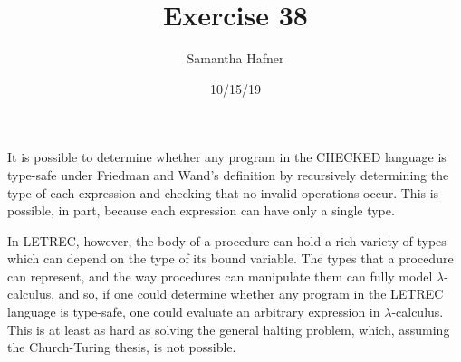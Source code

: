 \documentclass[12pt]{article}
\title{Exercise 38}
\author{Samantha Hafner}
\date{10/15/19}
\begin{document}
\maketitle

It is possible to determine whether any program in the CHECKED language is type-safe under Friedman and Wand's definition by recursively determining the type of each expression and checking that no invalid operations occur. This is possible, in part, because each expression can have only a single type.

In LETREC, however, the body of a procedure can hold a rich variety of types which can depend on the type of its bound variable. The types that a procedure can represent, and the way procedures can manipulate them can fully model $\lambda$-calculus, and so, if one could determine whether any program in the LETREC language is type-safe, one could evaluate an arbitrary expression in $\lambda$-calculus. This is at least as hard as solving the general halting problem, which, assuming the Church-Turing thesis, is not possible.
\end{document}
